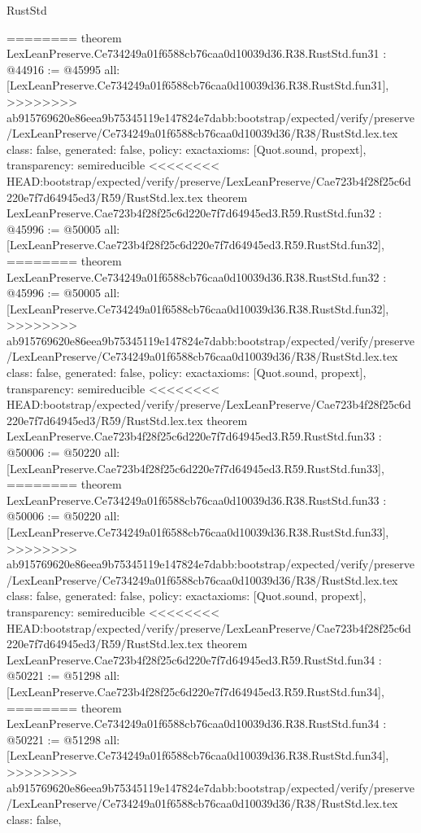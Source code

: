 \begin{lexlean}{RustStd}
\begin{coremodule}
{\begin{coremodule}
{{{{{{{{{{{{{{{{{{{{{{{{{{{{{{{{{{========
theorem LexLeanPreserve.Ce734249a01f6588cb76caa0d10039d36.R38.RustStd.fun31 : @44916 := @45995 {
  all: [LexLeanPreserve.Ce734249a01f6588cb76caa0d10039d36.R38.RustStd.fun31],
>>>>>>>> ab915769620e86eea9b75345119e147824e7dabb:bootstrap/expected/verify/preserve/LexLeanPreserve/Ce734249a01f6588cb76caa0d10039d36/R38/RustStd.lex.tex
  class: false,
  generated: false,
  policy: exact{axioms: [Quot.sound, propext]},
  transparency: semireducible
}
<<<<<<<< HEAD:bootstrap/expected/verify/preserve/LexLeanPreserve/Cae723b4f28f25c6d220e7f7d64945ed3/R59/RustStd.lex.tex
theorem LexLeanPreserve.Cae723b4f28f25c6d220e7f7d64945ed3.R59.RustStd.fun32 : @45996 := @50005 {
  all: [LexLeanPreserve.Cae723b4f28f25c6d220e7f7d64945ed3.R59.RustStd.fun32],
========
theorem LexLeanPreserve.Ce734249a01f6588cb76caa0d10039d36.R38.RustStd.fun32 : @45996 := @50005 {
  all: [LexLeanPreserve.Ce734249a01f6588cb76caa0d10039d36.R38.RustStd.fun32],
>>>>>>>> ab915769620e86eea9b75345119e147824e7dabb:bootstrap/expected/verify/preserve/LexLeanPreserve/Ce734249a01f6588cb76caa0d10039d36/R38/RustStd.lex.tex
  class: false,
  generated: false,
  policy: exact{axioms: [Quot.sound, propext]},
  transparency: semireducible
}
<<<<<<<< HEAD:bootstrap/expected/verify/preserve/LexLeanPreserve/Cae723b4f28f25c6d220e7f7d64945ed3/R59/RustStd.lex.tex
theorem LexLeanPreserve.Cae723b4f28f25c6d220e7f7d64945ed3.R59.RustStd.fun33 : @50006 := @50220 {
  all: [LexLeanPreserve.Cae723b4f28f25c6d220e7f7d64945ed3.R59.RustStd.fun33],
========
theorem LexLeanPreserve.Ce734249a01f6588cb76caa0d10039d36.R38.RustStd.fun33 : @50006 := @50220 {
  all: [LexLeanPreserve.Ce734249a01f6588cb76caa0d10039d36.R38.RustStd.fun33],
>>>>>>>> ab915769620e86eea9b75345119e147824e7dabb:bootstrap/expected/verify/preserve/LexLeanPreserve/Ce734249a01f6588cb76caa0d10039d36/R38/RustStd.lex.tex
  class: false,
  generated: false,
  policy: exact{axioms: [Quot.sound, propext]},
  transparency: semireducible
}
<<<<<<<< HEAD:bootstrap/expected/verify/preserve/LexLeanPreserve/Cae723b4f28f25c6d220e7f7d64945ed3/R59/RustStd.lex.tex
theorem LexLeanPreserve.Cae723b4f28f25c6d220e7f7d64945ed3.R59.RustStd.fun34 : @50221 := @51298 {
  all: [LexLeanPreserve.Cae723b4f28f25c6d220e7f7d64945ed3.R59.RustStd.fun34],
========
theorem LexLeanPreserve.Ce734249a01f6588cb76caa0d10039d36.R38.RustStd.fun34 : @50221 := @51298 {
  all: [LexLeanPreserve.Ce734249a01f6588cb76caa0d10039d36.R38.RustStd.fun34],
>>>>>>>> ab915769620e86eea9b75345119e147824e7dabb:bootstrap/expected/verify/preserve/LexLeanPreserve/Ce734249a01f6588cb76caa0d10039d36/R38/RustStd.lex.tex
  class: false,
}}}}}}}}}}}}}}}}}}}}}}}}}}}}}}}}}}}}}}
\end{coremodule}}
\end{coremodule}
\end{lexlean}
